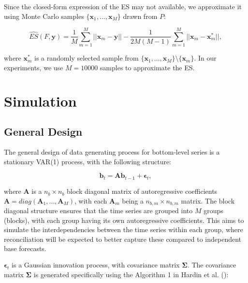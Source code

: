 \documentclass[
  11pt,
  letterpaper,
  DIV=11,
  numbers=noendperiod,
  titlepage]{scrartcl}
\begin{document}
Since the closed-form expression of the ES may not available, we
approximate it using Monte Carlo samples
\(\{\boldsymbol{x}_1, \ldots, \boldsymbol{x}_M\}\) drawn from \(P\):

\[
\widehat{ES}(F, \boldsymbol{y}) = \frac{1}{M} \sum_{m=1}^M ||\boldsymbol{x}_m - \boldsymbol{y}|| - \frac{1}{2M(M-1)} \sum_{m=1}^M ||\boldsymbol{x}_m - \boldsymbol{x}^*_m||,
\]

where \(\boldsymbol{x}^*_m\) is a randomly selected sample from
\(\{\boldsymbol{x}_1, \ldots, \boldsymbol{x}_M\} \setminus \{\boldsymbol{x}_m\}\).
In our experiments, we use \(M=10000\) samples to approximate the ES.

\section{Simulation}\label{sec-simulation}

\subsection{General Design}\label{general-design}

The general design of data generating process for bottom-level series is
a stationary VAR(1) process, with the following structure:

\[
\boldsymbol{b}_t = \boldsymbol{A} \boldsymbol{b}_{t-1} + \boldsymbol{\epsilon}_t,
\]

where \(\boldsymbol{A}\) is a \(n_b \times n_b\) block diagonal matrix
of autoregressive coefficients
\(\boldsymbol{A} = diag(\boldsymbol{A}_1, \ldots, \boldsymbol{A}_M)\),
with each \(\boldsymbol{A}_m\) being a \(n_{b,m} \times n_{b,m}\)
matrix. The block diagonal structure ensures that the time series are
grouped into \(M\) groups (blocks), with each group having its own
autoregressive coefficients. This aims to simulate the interdependencies
between the time series within each group, where reconciliation will be
expected to better capture these compared to independent base forecasts.

\(\boldsymbol{\epsilon}_t\) is a Gaussian innovation process, with
covariance matrix \(\boldsymbol{\Sigma}\). The covariance matrix
\(\boldsymbol{\Sigma}\) is generated specifically using the Algorithm 1
in Hardin et al. ():
\end{document}
